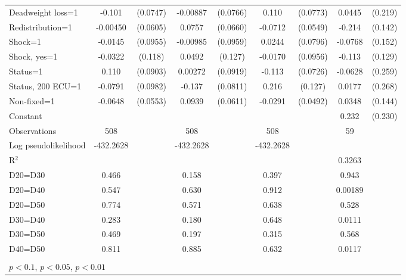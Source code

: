 \begin{tabular}{l|cccccc|cc}
Deadweight loss=1&   -0.101         & (0.0747)& -0.00887         & (0.0766)&    0.110         & (0.0773)&   0.0445         &  (0.219)\\
Redistribution=1& -0.00450         & (0.0605)&   0.0757         & (0.0660)&  -0.0712         & (0.0549)&   -0.214         &  (0.142)\\
Shock=1         &  -0.0145         & (0.0955)& -0.00985         & (0.0959)&   0.0244         & (0.0796)&  -0.0768         &  (0.152)\\
Shock, yes=1    &  -0.0322         &  (0.118)&   0.0492         &  (0.127)&  -0.0170         & (0.0956)&   -0.113         &  (0.129)\\
Status=1        &    0.110         & (0.0903)&  0.00272         & (0.0919)&   -0.113         & (0.0726)&  -0.0628         &  (0.259)\\
Status, 200 ECU=1&  -0.0791         & (0.0982)&   -0.137\sym{*}  & (0.0811)&    0.216\sym{*}  &  (0.127)&   0.0177         &  (0.268)\\
Non-fixed=1     &  -0.0648         & (0.0553)&   0.0939         & (0.0611)&  -0.0291         & (0.0492)&   0.0348         &  (0.144)\\
Constant        &                  &         &                  &         &                  &         &    0.232         &  (0.230)\\
\hline
Observations    &      508         &         &      508         &         &      508         &         &       59         &         \\

Log pseudolikelihood  &  -432.2628   &         &      -432.2628             &         &        -432.2628           &         &           &   \\ 
R$^2$      &                  &         &                  &         &                  &         &       0.3263    &   \\ 
D20=D30         &    0.466         &         &    0.158         &         &    0.397         &         &    0.943         &         \\
D20=D40         &    0.547         &         &    0.630         &         &    0.912         &         &  0.00189         &         \\
D20=D50         &    0.774         &         &    0.571         &         &    0.638         &         &    0.528         &         \\
D30=D40         &    0.283         &         &    0.180         &         &    0.648         &         &   0.0111         &         \\
D30=D50         &    0.469         &         &    0.197         &         &    0.315         &         &    0.568         &         \\
D40=D50         &    0.811         &         &    0.885         &         &    0.632         &         &   0.0117         &         \\
\hline\hline
\multicolumn{9}{p{16cm}}{\tiny }\\
\multicolumn{9}{l}{\tiny \sym{*} \(p<0.1\), \sym{**} \(p<0.05\), \sym{***} \(p<0.01\)}\\
\end{tabular}